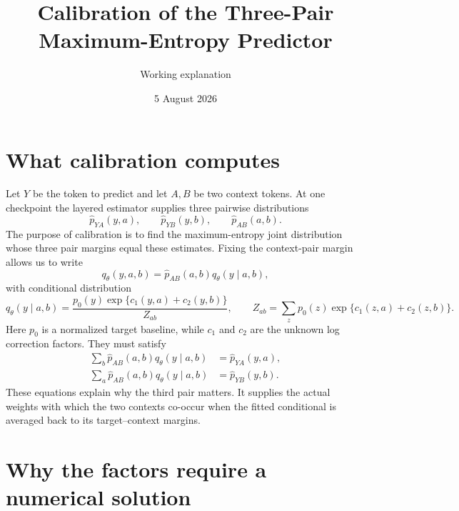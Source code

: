 \documentclass[11pt]{article}
\title{Calibration of the Three-Pair Maximum-Entropy Predictor}
\author{Working explanation}
\date{5 August 2026}
\begin{document}
\maketitle

\section{What calibration computes}

Let $Y$ be the token to predict and let $A,B$ be two context tokens.
At one checkpoint the layered estimator supplies three pairwise
distributions
\[
 \widehat p_{YA}(y,a),\qquad
 \widehat p_{YB}(y,b),\qquad
 \widehat p_{AB}(a,b).
\]
The purpose of calibration is to find the maximum-entropy joint
distribution whose three pair margins equal these estimates.  Fixing the
context-pair margin allows us to write
\begin{equation}
 q_\theta(y,a,b)
 =\widehat p_{AB}(a,b)q_\theta(y\mid a,b),
 \label{eq:joint}
\end{equation}
with conditional distribution
\begin{equation}
 q_\theta(y\mid a,b)
 =\frac{p_0(y)\exp\{c_1(y,a)+c_2(y,b)\}}{Z_{ab}},
 \qquad
 Z_{ab}=\sum_zp_0(z)\exp\{c_1(z,a)+c_2(z,b)\}.
 \label{eq:conditional}
\end{equation}
Here $p_0$ is a normalized target baseline, while $c_1$ and $c_2$ are
the unknown log correction factors.  They must satisfy
\begin{align}
 \sum_b\widehat p_{AB}(a,b)q_\theta(y\mid a,b)
 &=\widehat p_{YA}(y,a),
 \label{eq:ya-margin}\\
 \sum_a\widehat p_{AB}(a,b)q_\theta(y\mid a,b)
 &=\widehat p_{YB}(y,b).
 \label{eq:yb-margin}
\end{align}
These equations explain why the third pair matters.  It supplies the
actual weights with which the two contexts co-occur when the fitted
conditional is averaged back to its target--context margins.

\section{Why the factors require a numerical solution}
\end{document}
